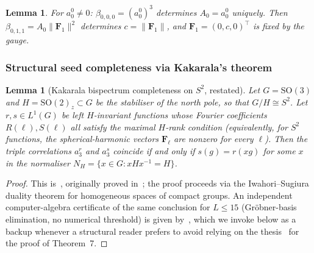 \documentclass{article}
\newtheorem{lemma}[theorem]{Lemma}
\theoremstyle{definition}
\theoremstyle{remark}
\newcommand{\SO}{\mathrm{SO}}
\newcommand{\norm}[1]{\lVert #1 \rVert}
\theoremstyle{definition}
\begin{document}
\begin{lemma}\label{lem:app-F0F1}
For $a_0^0 \ne 0$:
$\beta_{0,0,0} = (a_0^0)^3$ determines $A_0 = a_0^0$ uniquely.
Then $\beta_{0,1,1} = A_0 \norm{\mathbf{F}_1}^2$ determines
$c = \norm{\mathbf{F}_1}$, and $\mathbf{F}_1 = (0, c, 0)^\top$
is fixed by the gauge.
\end{lemma}

\subsubsection{Structural seed completeness via Kakarala's theorem}
\label{sec:app-seed-kakarala}

\begin{lemma}[Kakarala bispectrum completeness on $S^2$, restated]
\label{lem:app-kakarala-thm7}
Let $G = \SO(3)$ and $H = \SO(2)_z \subset G$ be the stabiliser of
the north pole, so that $G/H \cong S^2$.
Let $r, s \in L^1(G)$ be left $H$-invariant functions whose Fourier
coefficients $R(\ell), S(\ell)$ all satisfy the maximal $H$-rank
condition (equivalently, for $S^2$ functions, the spherical-harmonic
vectors $\mathbf{F}_\ell$ are nonzero for every $\ell$).  Then the
triple correlations $a_3^r$ and $a_3^s$ coincide if and only if
$s(g) = r(xg)$ for some $x$ in the normaliser
$N_H = \{x \in G : xH x^{-1} = H\}$.
\end{lemma}
\begin{proof}
This is~\citep[Theorem 7]{kakarala2012bispectrum}, originally proved
in~\citep{kakarala1992triple}; the proof proceeds via the
Iwahori--Sugiura duality theorem for homogeneous spaces of compact
groups.  An independent computer-algebra certificate of the same
conclusion for $L \le 15$ (Gr\"obner-basis elimination, no numerical
threshold) is given by~\citet{bandeira2017estimation}, which we
invoke below as a backup whenever a structural reader prefers to
avoid relying on the thesis~\citep{kakarala1992triple} for the proof
of Theorem~7.
\end{proof}
\end{document}
